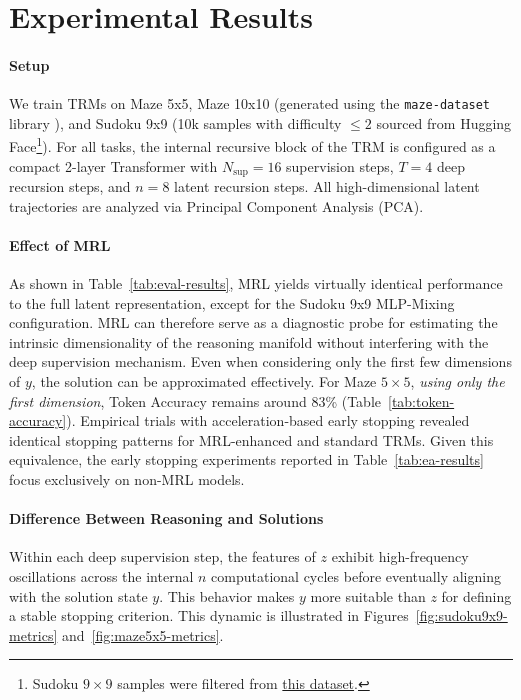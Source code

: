 \documentclass{article}
\begin{document}
\section{Experimental Results}

\paragraph{Setup}
We train TRMs on Maze 5x5, Maze 10x10 (generated using the \texttt{maze-dataset} library \cite{maze-dataset}), and Sudoku 9x9 (10k samples with difficulty $\leq 2$ sourced from Hugging Face\footnote{Sudoku $9\times9$ samples were filtered from \href{https://huggingface.co/datasets/Ritvik19/Sudoku-Dataset}{this dataset}.}).
For all tasks, the internal recursive block of the TRM is configured as a compact 2-layer Transformer with
$N_{\text{sup}} = 16$ supervision steps, $T = 4$ deep recursion steps, and $n = 8$ latent recursion steps. All high-dimensional latent trajectories are analyzed via Principal Component Analysis (PCA).

\paragraph{Effect of MRL}
As shown in Table~\ref{tab:eval-results}, MRL yields virtually identical performance to the full latent representation, except for the Sudoku 9x9 MLP-Mixing configuration.
MRL can therefore serve as a diagnostic probe for estimating the intrinsic dimensionality of the reasoning manifold without interfering with the deep supervision mechanism.
Even when considering only the first few dimensions of $y$, the solution can be approximated effectively. For Maze $5\times5$, \textit{using only the first dimension}, Token Accuracy remains around 83\% (Table~\ref{tab:token-accuracy}).
Empirical trials with acceleration-based early stopping revealed identical stopping patterns for MRL-enhanced and standard TRMs.
Given this equivalence, the early stopping experiments reported in Table~\ref{tab:ea-results} focus exclusively on non-MRL models.

\paragraph{Difference Between Reasoning and Solutions}
Within each deep supervision step, the features of $z$ exhibit high-frequency oscillations across the internal $n$ computational cycles before eventually aligning with the solution state $y$.
This behavior makes $y$ more suitable than $z$ for defining a stable stopping criterion.
This dynamic is illustrated in Figures~\ref{fig:sudoku9x9-metrics} and~\ref{fig:maze5x5-metrics}.
\end{document}
